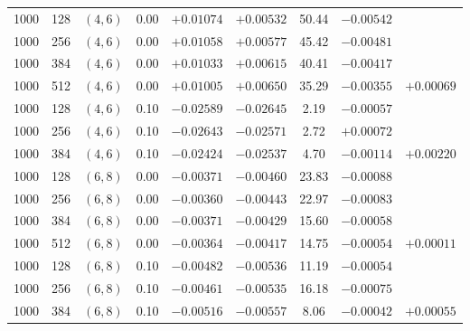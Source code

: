 \begin{table}[!htbp]
\begin{tabular}{@{}ccccccccc@{}}
\hline
1000 & 128 & $(4,6)$ & 0.00 & $+0.01074$ & $+0.00532$ & 50.44 & $-0.00542$ &  \\
1000 & 256 & $(4,6)$ & 0.00 & $+0.01058$ & $+0.00577$ & 45.42 & $-0.00481$ &  \\
1000 & 384 & $(4,6)$ & 0.00 & $+0.01033$ & $+0.00615$ & 40.41 & $-0.00417$ &  \\
1000 & 512 & $(4,6)$ & 0.00 & $+0.01005$ & $+0.00650$ & 35.29 & $-0.00355$ & $+0.00069$ \\
\hline
1000 & 128 & $(4,6)$ & 0.10 & $-0.02589$ & $-0.02645$ &  2.19 & $-0.00057$ &  \\
1000 & 256 & $(4,6)$ & 0.10 & $-0.02643$ & $-0.02571$ &  2.72 & $+0.00072$ &  \\
1000 & 384 & $(4,6)$ & 0.10 & $-0.02424$ & $-0.02537$ &  4.70 & $-0.00114$ & $+0.00220$ \\
\hline
1000 & 128 & $(6,8)$ & 0.00 & $-0.00371$ & $-0.00460$ & 23.83 & $-0.00088$ &  \\
1000 & 256 & $(6,8)$ & 0.00 & $-0.00360$ & $-0.00443$ & 22.97 & $-0.00083$ &  \\
1000 & 384 & $(6,8)$ & 0.00 & $-0.00371$ & $-0.00429$ & 15.60 & $-0.00058$ &  \\
1000 & 512 & $(6,8)$ & 0.00 & $-0.00364$ & $-0.00417$ & 14.75 & $-0.00054$ & $+0.00011$ \\
\hline
1000 & 128 & $(6,8)$ & 0.10 & $-0.00482$ & $-0.00536$ & 11.19 & $-0.00054$ &  \\
1000 & 256 & $(6,8)$ & 0.10 & $-0.00461$ & $-0.00535$ & 16.18 & $-0.00075$ &  \\
1000 & 384 & $(6,8)$ & 0.10 & $-0.00516$ & $-0.00557$ &  8.06 & $-0.00042$ & $+0.00055$ \\
\hline
\end{tabular}
\end{table}
